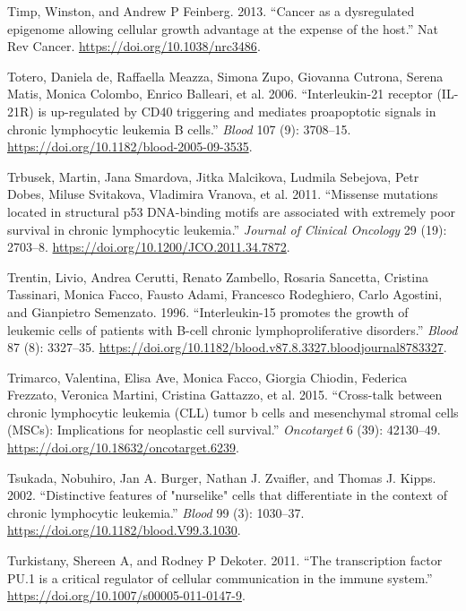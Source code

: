 \documentclass[11pt, a4paper, twosided]{book}
\newenvironment{CSLReferences}%
  {}%
  {\par}
\begin{document}
\begin{CSLReferences}{1}{0}
\leavevmode{}%
Timp, Winston, and Andrew P Feinberg. 2013. {``{Cancer as a dysregulated epigenome allowing cellular growth advantage at the expense of the host}.''} Nat Rev Cancer. \url{https://doi.org/10.1038/nrc3486}.

\leavevmode{}%
Totero, Daniela de, Raffaella Meazza, Simona Zupo, Giovanna Cutrona, Serena Matis, Monica Colombo, Enrico Balleari, et al. 2006. {``{Interleukin-21 receptor (IL-21R) is up-regulated by CD40 triggering and mediates proapoptotic signals in chronic lymphocytic leukemia B cells.}''} \emph{Blood} 107 (9): 3708--15. \url{https://doi.org/10.1182/blood-2005-09-3535}.

\leavevmode{}%
Trbusek, Martin, Jana Smardova, Jitka Malcikova, Ludmila Sebejova, Petr Dobes, Miluse Svitakova, Vladimira Vranova, et al. 2011. {``{Missense mutations located in structural p53 DNA-binding motifs are associated with extremely poor survival in chronic lymphocytic leukemia}.''} \emph{Journal of Clinical Oncology} 29 (19): 2703--8. \url{https://doi.org/10.1200/JCO.2011.34.7872}.

\leavevmode{}%
Trentin, Livio, Andrea Cerutti, Renato Zambello, Rosaria Sancetta, Cristina Tassinari, Monica Facco, Fausto Adami, Francesco Rodeghiero, Carlo Agostini, and Gianpietro Semenzato. 1996. {``{Interleukin-15 promotes the growth of leukemic cells of patients with B-cell chronic lymphoproliferative disorders}.''} \emph{Blood} 87 (8): 3327--35. \url{https://doi.org/10.1182/blood.v87.8.3327.bloodjournal8783327}.

\leavevmode{}%
Trimarco, Valentina, Elisa Ave, Monica Facco, Giorgia Chiodin, Federica Frezzato, Veronica Martini, Cristina Gattazzo, et al. 2015. {``{Cross-talk between chronic lymphocytic leukemia (CLL) tumor b cells and mesenchymal stromal cells (MSCs): Implications for neoplastic cell survival}.''} \emph{Oncotarget} 6 (39): 42130--49. \url{https://doi.org/10.18632/oncotarget.6239}.

\leavevmode{}%
Tsukada, Nobuhiro, Jan A. Burger, Nathan J. Zvaifler, and Thomas J. Kipps. 2002. {``{Distinctive features of "nurselike" cells that differentiate in the context of chronic lymphocytic leukemia}.''} \emph{Blood} 99 (3): 1030--37. \url{https://doi.org/10.1182/blood.V99.3.1030}.

\leavevmode{}%
Turkistany, Shereen A, and Rodney P Dekoter. 2011. {``{The transcription factor PU.1 is a critical regulator of cellular communication in the immune system}.''} \url{https://doi.org/10.1007/s00005-011-0147-9}.


\end{CSLReferences}
\end{document}
